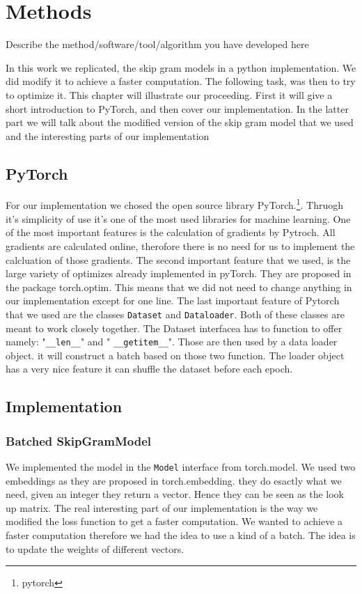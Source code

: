 \chapter{Methods}\label{chap:methods}
Describe the method/software/tool/algorithm you have developed here

In this work we replicated, the skip gram models in a python implementation. We did modify it to achieve a faster computation. The following task, was then to try to optimize it. This chapter will illustrate our proceeding. First it will give a short introduction to PyTorch, and then cover our implementation. In the latter part we will talk about the modified version of the skip gram model that we used and the interesting parts of our implementation
\section{PyTorch}
For our implementation we chosed the open source library PyTorch.\footnote{pytorch}. Thruogh it's simplicity of use it's one of the most used libraries for machine learning. One of the most important features is the calculation of gradients by Pytroch. All gradients are calculated online, therofore there is no need for us to implement the calcluation of those gradients. The second important feature that we used, is the large variety of optimizes already implemented in pyTorch. They are proposed in the package torch.optim. This means that we did not need to change anything in our implementation except for one line. The last important feature of Pytorch that we used are the classes \texttt{Dataset} and \texttt{Dataloader}. Both of these classes are meant to work closely together.   The Dataset interfacea has to function to offer namely: "\texttt{\_\_len\_\_}" and " \texttt{\_\_getitem\_\_}". Those are then used by a data loader object. it will construct a batch based on those two function. The loader object has a very nice feature it can shuffle the dataset before each epoch. 
\section{Implementation}
\subsection{Batched SkipGramModel}
We implemented the model in the \texttt{Model} interface from torch.model. We used two embeddings as they are proposed in torch.embedding. they do esactly what we need, given an integer they return a vector. Hence they can be seen as the look up matrix. The real interesting part of our implementation is the way we modified the loss function to get a faster computation. 
We wanted to achieve a faster computation therefore we  had the idea to use a kind of a batch. The idea is to update the weights of different vectors. 
